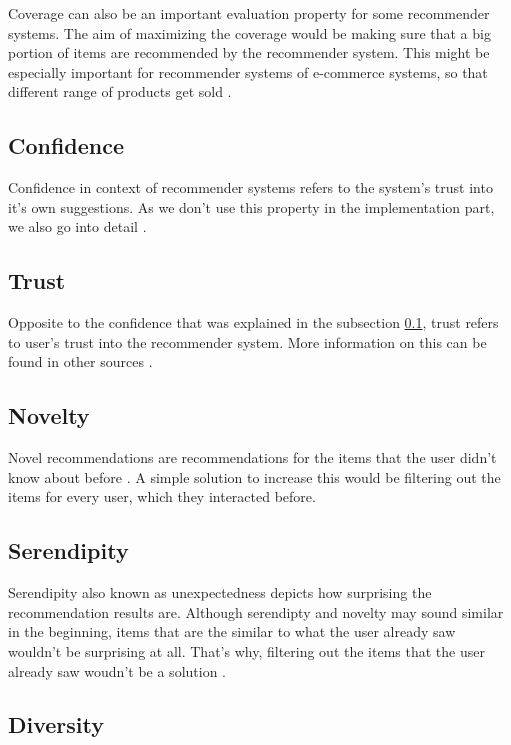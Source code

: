 Coverage can also be an important evaluation property for some recommender systems. The aim of maximizing the coverage would be making sure that a big portion of items are recommended by the recommender system. This might be especially important for recommender systems of e-commerce systems, so that different range of products get sold \cite{shani2011evaluating}.


\subsection{Confidence}\label{research:confidence}

Confidence in context of recommender systems refers to the system's trust into it's own suggestions. As we don't use this property in the implementation part, we also go into detail \cite{herlocker2000explaining}.

\subsection{Trust}

Opposite to the confidence that was explained in the subsection \ref{research:confidence}, trust refers to user's trust into the recommender system. More information on this can be found in other sources \cite{shani2011evaluating}.

\subsection{Novelty}

Novel recommendations are recommendations for the items that the user didn't know about before \cite{shani2011evaluating}. A simple solution to increase this would be filtering out the items for every user, which they interacted before.

\subsection{Serendipity}

Serendipity also known as unexpectedness depicts how surprising the recommendation results are. Although serendipty and novelty may sound similar in the beginning, items that are the similar to what the user already saw wouldn't be surprising at all. That's why, filtering out the items that the user already saw woudn't be a solution \cite{shani2011evaluating}.

\subsection{Diversity}

